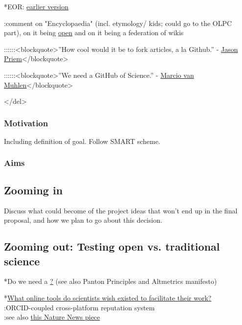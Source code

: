 \documentclass[final,authoryear,3p]{elsarticle-open-drafting}
\begin{document}
*EOR: \href{http://www.science3point0.com/coaspedia/index.php/Proposals:Wikimedia_Deutschland/2010/Wissenswert/Wissenschaft_als_Wiki/English}{earlier version}


:comment on "Encyclopaedia" (incl. etymology/ kids; could go to the OLPC part), on it being \href{http://www.opendefinition.org/}{open} and on it being a federation of wikis


::::::<blockquote>''How cool would it be to fork articles, a la Github.'' - \href{http://friendfeed.com/cameronneylon/c476db70/imo-this-is-possibly-single-most-useful-thing-we}{Jason Priem}</blockquote>

::::::<blockquote>''We need a GitHub of Science.'' - \href{http://marciovm.com/i-want-a-github-of-science}{Marcio van Muhlen}</blockquote>

</del>
\subsubsection{Motivation}
Including definition of goal. Follow SMART scheme.

\subsubsection{Aims}

\subsection{Zooming in}
Discuss what could become of the project ideas that won't end up in the final proposal, and how we plan to go about this decision.

\subsection{Zooming out: Testing open vs. traditional science}

*Do we need a \href{http://open-science.pen.io/ manifesto for open science}? (see also Panton Principles and Altmetrics manifesto)

*\href{http://www.quora.com/What-online-tools-do-scientists-wish-existed-to-facilitate-their-work/answer/Marius-Kempe}{What online tools do scientists wish existed to facilitate their work?}\\
:ORCID-coupled cross-platform reputation system\\
:see also \href{http://www.nature.com/news/2011/110511/full/473138a.html}{this Nature News piece}
\end{document}
